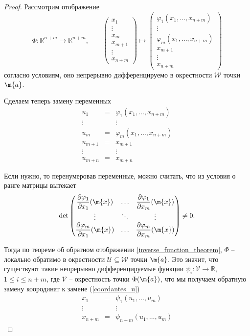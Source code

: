 \begin{proof}
Рассмотрим отображение
\[
 \Phi: \mathbb{R}^{n+m} \to \mathbb{R}^{n+m}, \qquad \begin{pmatrix}
     x_1 \\ \vdots \\ x_m \\ x_{m+1} \\ \vdots \\ x_{n+m}
 \end{pmatrix} \mapsto \begin{pmatrix}
     \varphi_1(x_1,\ldots, x_{n+m}) \\
     \vdots \\
     \varphi_m(x_1,\ldots, x_{n+m}) \\
     x_{m+1} \\ \vdots \\x_{n+m}
 \end{pmatrix}
\]
согласно условиям, оно непрерывно дифференцируемо в окрестности $\mathscr{W}$ точки $\m{a}$.

Сделаем теперь замену переменных
\begin{equation}\label{coordantes_u}
     \begin{matrix}
     u_1 & = & \varphi_1(x_1,\ldots, x_{n+m}) \\
     \vdots & & \vdots\\
     u_m & = & \varphi_m(x_1,\ldots, x_{n+m}) \\
     u_{m+1} &=& x_{m+1} \\
     \vdots && \vdots \\
     u_{m+n} &=& x_{m+n}
 \end{matrix}
\end{equation}

Если нужно, то перенумеровав переменные, можно считать, что из условия о ранге матрицы вытекает
    \[
     \mathrm{det} \begin{pmatrix}
         \dfrac{\partial \varphi_1}{\partial x_{1}}(\m{x}) &\ldots& \dfrac{\partial \varphi_1}{\partial x_{m}}(\m{x}) \\
         \vdots & \ddots & \vdots \\
         \dfrac{\partial \varphi_m}{\partial x_{1}}(\m{x}) &\ldots & \dfrac{\partial \varphi_m}{\partial x_{m}}(\m{x})
     \end{pmatrix} \ne 0.
    \]

Тогда по теореме об обратном отображении \ref{inverse_function_theorem}, $\Phi$ -- локально обратимо в окрестности $\mathscr{U} \subseteq \mathscr{W}$ точки $\m{a}.$ Это значит, что существуют такие непрерывно дифференцируемые функции $\psi_i: \mathscr{V} \to \mathbb{R}$, $1\le i \le n+m$, где $\mathscr{V}$ -- окрестность точки $\Phi(\m{a})$, что мы получаем обратную замену коородинат к замене (\ref{coordantes_u}) 
\[
 \begin{matrix}
     x_1 & = & \psi_1(u_1,\ldots, u_{m}) \\
     \vdots & & \vdots\\
     x_{n+m} & = & \psi_{n+m}(u_1,\ldots, u_m)
 \end{matrix}
\]


\end{proof}
